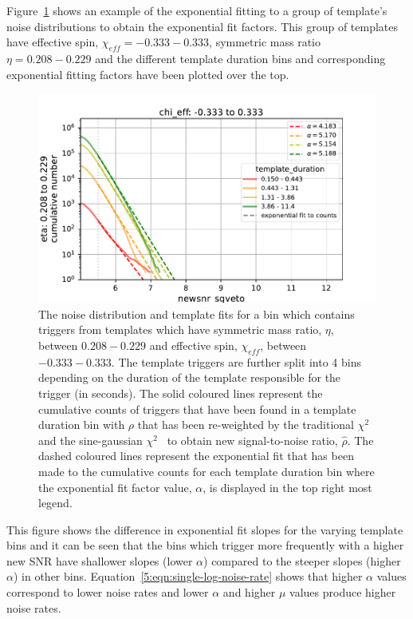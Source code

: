 Figure~\ref{5:fig:template-fits} shows an example of the exponential fitting to a group of template's noise distributions to obtain the exponential fit factors. This group of templates have effective spin, $\chi_{eff} = -0.333 - 0.333$, symmetric mass ratio $\eta = 0.208 - 0.229$ and the different template duration bins and corresponding exponential fitting factors have been plotted over the top.
%
\begin{figure}
    \centering
    \includegraphics[width=1.0\textwidth]{images/5_pycbclive/others/fit_plot.pdf}
    \caption{The noise distribution and template fits for a bin which contains triggers from templates which have symmetric mass ratio, $\eta$, between $0.208 - 0.229$ and effective spin, $\chi_{eff}$, between $-0.333 - 0.333$. The template triggers are further split into 4 bins depending on the duration of the template responsible for the trigger (in seconds). The solid coloured lines represent the cumulative counts of triggers that have been found in a template duration bin with $\rho$ that has been re-weighted by the traditional $\chi^{2}$~\cite{Allen_Chi:2005} and the sine-gaussian $\chi^{2}$~\cite{PyCBC_sg:2018} to obtain new signal-to-noise ratio, $\hat{\rho}$. The dashed coloured lines represent the exponential fit that has been made to the cumulative counts for each template duration bin where the exponential fit factor value, $\alpha$, is displayed in the top right most legend.}
    \label{5:fig:template-fits}
\end{figure}
%
This figure shows the difference in exponential fit slopes for the varying template bins and it can be seen that the bins which trigger more frequently with a higher new SNR have shallower slopes (lower $\alpha$) compared to the steeper slopes (higher $\alpha$) in other bins. Equation~\ref{5:eqn:single-log-noise-rate} shows that higher $\alpha$ values correspond to lower noise rates and lower $\alpha$ and higher $\mu$ values produce higher noise rates.

